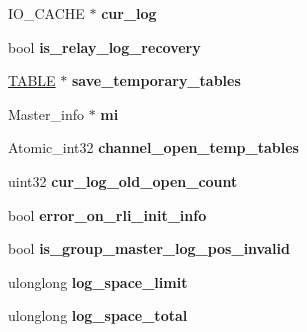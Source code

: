 \begin{DoxyCompactItemize}
\item 
\mbox{\label{classRelay__log__info_abfabebf7bd87a1cb4b673663270587e1}} 
I\+O\+\_\+\+C\+A\+C\+HE $\ast$ {\bfseries cur\+\_\+log}
\item 
\mbox{\label{classRelay__log__info_a71010a7a3ecb75a25dce1f9880bbcf64}} 
bool {\bfseries is\+\_\+relay\+\_\+log\+\_\+recovery}
\item 
\mbox{\label{classRelay__log__info_a0d1f80d296311d8b2dfa5f9b6a9e5f42}} 
\mbox{\hyperlink{structTABLE}{T\+A\+B\+LE}} $\ast$ {\bfseries save\+\_\+temporary\+\_\+tables}
\item 
\mbox{\label{classRelay__log__info_ae1435014c6f1b00509cc0533d300a119}} 
Master\+\_\+info $\ast$ {\bfseries mi}
\item 
\mbox{\label{classRelay__log__info_a79d8c12ad2e90a7c09629b2dc12f9fc0}} 
Atomic\+\_\+int32 {\bfseries channel\+\_\+open\+\_\+temp\+\_\+tables}
\item 
\mbox{\label{classRelay__log__info_a0e85360485fac189a5215b3bc6388c94}} 
uint32 {\bfseries cur\+\_\+log\+\_\+old\+\_\+open\+\_\+count}
\item 
\mbox{\label{classRelay__log__info_adf7b8e0b547257f58d2603709ecea80b}} 
bool {\bfseries error\+\_\+on\+\_\+rli\+\_\+init\+\_\+info}
\item 
\mbox{\label{classRelay__log__info_a9a590ea77f4e17a4caf2750901f9ca37}} 
bool {\bfseries is\+\_\+group\+\_\+master\+\_\+log\+\_\+pos\+\_\+invalid}
\item 
\mbox{\label{classRelay__log__info_a6e1db8a2c37725a0966793fef9968b34}} 
ulonglong {\bfseries log\+\_\+space\+\_\+limit}
\item 
\mbox{\label{classRelay__log__info_aa64c26af8f29f6ea0599d89bb877d719}} 
ulonglong {\bfseries log\+\_\+space\+\_\+total}
\item 
\mbox{\label{classRelay__log__info_a9867ec2dffe865c06c3da573f466bf34}} 

\end{DoxyCompactItemize}
